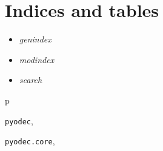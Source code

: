 \documentclass[letterpaper,10pt,english]{sphinxmanual}
\begin{document}
\chapter{Indices and tables}
\label{index:indices-and-tables}\begin{itemize}
\item {} 
\emph{genindex}

\item {} 
\emph{modindex}

\item {} 
\emph{search}

\end{itemize}


\renewcommand{\indexname}{Python Module Index}
\begin{theindex}
\def\bigletter#1{{\Large\sffamily#1}\nopagebreak\vspace{1mm}}
\bigletter{p}
\item {\texttt{pyodec}}, \pageref{root:module-pyodec}
\item {\texttt{pyodec.core}}, \pageref{classes:module-pyodec.core}
\end{theindex}

\renewcommand{\indexname}{Index}
\printindex
\end{document}
